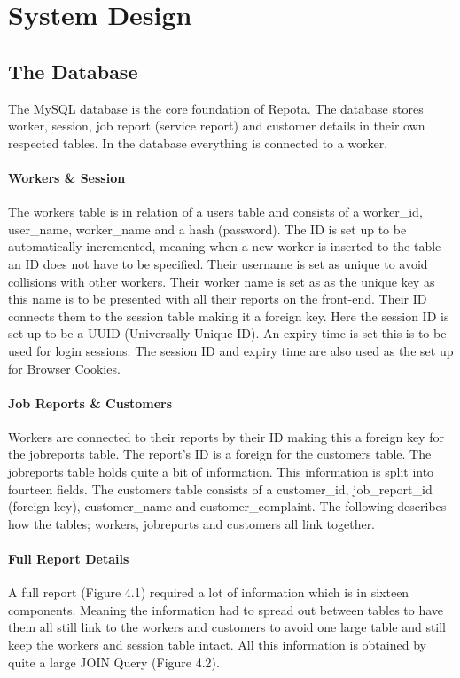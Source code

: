 \chapter{System Design}
\section{The Database}
The MySQL database is the core foundation of Repota. The database stores worker, session, job report (service report) and customer details in their own respected tables. In the database everything is connected to a worker. 

\subsubsection{Workers \& Session}
The workers table is in relation of a users table and consists of a worker\_id, user\_name, worker\_name and a hash (password). The ID is set up to be automatically incremented, meaning when a new worker is inserted to the table an ID does not have to be specified. Their username is set as unique to avoid collisions with other workers. Their worker name is set as as the unique key as this name is to be presented with all their reports on the front-end. Their ID connects them to the session table making it a foreign key. Here the session ID is set up to be a UUID (Universally Unique ID). An expiry time is set this is to be used for login sessions. The session ID and expiry time are also used as the set up for Browser Cookies.

\subsubsection{Job Reports \& Customers}
Workers are connected to their reports by their ID making this a foreign key for the jobreports table. The report's ID is a foreign for the customers table. The jobreports table holds quite a bit of information. This information is split into fourteen fields. The customers table consists of a customer\_id, job\_report\_id (foreign key), customer\_name and customer\_complaint.  The following describes how the tables; workers, jobreports and customers all link together. 
 \newpage
\subsubsection{Full Report Details}
A full report (Figure 4.1) required a lot of information which is in sixteen components. Meaning the information had to spread out between tables to have them all still link to the workers and customers to avoid one large table and still keep the workers and session table intact. All this information is obtained by quite a large JOIN Query (Figure 4.2).

